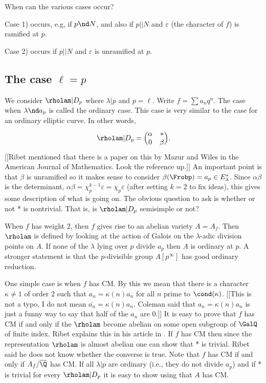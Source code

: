 \documentclass{report}
\begin{document}
When can the various cases occur?

Case 1) occurs, e.g, if $p\nd N$, and also if $p||N$ and
$\varepsilon$ (the character of $f$) is ramified at $p$.

Case 2) occurs if $p||N$ and $\varepsilon$ is unramified at $p$.


\subsection{The case $\ell=p$}
We consider $\rholam|D_p$ where $\lambda|p$ and $p=\ell$.
Write $f=\sum a_nq^n$. The case when $\lambda\nd a_p$ is called the ordinary case.
This case is very similar to the case for an ordinary elliptic curve.
In other words,
$$\rholam|D_p=\Bigl(\begin{matrix}\alpha&*\\0&\beta\end{matrix}\Bigr).$$
[[Ribet mentioned that there is a paper on this by
Mazur and Wiles in the American Journal of Mathematics. Look the reference up.]]
An important point is that $\beta$ is unramified so it makes sense to
consider $\beta(\Frobp)=a_p\in{}E_{\lambda}^*$. Since
$\alpha\beta$ is the determinant,
$\alpha\beta=\chi_p^{k-1}\varepsilon=\chi_p\varepsilon$
(after setting $k=2$ to fix ideas), this gives some
description of what is going on. The obvious question to ask
is whether or not * is nontrivial. That is,
is $\rholam|D_p$ semisimple or not?

When $f$ has weight $2$, then $f$ gives rise to an abelian variety
$A=A_f$. Then $\rholam$ is defined by looking at the action of Galois
on the $\lambda$-adic
division points on $A$. If none of the $\lambda$ lying over $p$ divide $a_p$ then
$A$ is ordinary at $p$. A stronger statement is that the $p$-divisible group
$A[p^{\infty}]$ has good ordinary reduction.

One simple case is when $f$ has CM. By this we mean that there is a
character $\kappa\neq 1$ of order 2 such that
$a_n=\kappa(n)a_n$ for all $n$ prime to $\cond(\kappa)$. [[This
is not a typo, I do not mean $\overline{a_n}=\kappa(n)a_n$. Coleman
said that $a_n=\kappa(n)a_n$ is just a funny way to say that half of
the $a_n$ are $0$.]] It is easy to prove that $f$ has CM if and only if the
$\rholam$ become abelian on some open subgroup of $\GalQ$ of finite index.
Ribet explains this in his article in \cite{ribet:galoisattached}.
If $f$ has CM then since the representation $\rholam$ is almost
abelian one can show that * is trivial. Ribet said he does
not know whether the converse is true.
Note that $f$ has CM if and only if $A_f/\overline{\Q}$ has CM. If all
$\lambda|p$ are ordinary (i.e., they do not divide $a_p$) and
if * is trivial for every $\rholam|D_p$ it is easy to show
using \cite{serre:ladic} that $A$ has CM.
\end{document}
